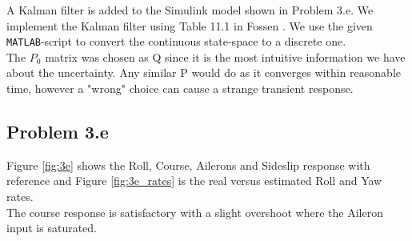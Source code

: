 A Kalman filter is added to the Simulink model shown in Problem 3.e. We implement the Kalman filter using Table 11.1 in Fossen \cite{Fossen2011}. We use the given \texttt{MATLAB}-script to convert the continuous state-space to a discrete one. \\

The $P_0$ matrix was chosen as Q since it is the most intuitive information we have about the uncertainty. Any similar P would do as it converges within reasonable time, however a "wrong" choice can cause a strange transient response. \\

\subsection*{Problem 3.e}

Figure \ref{fig:3e} shows the Roll, Course, Ailerons and Sideslip response with reference and Figure \ref{fig:3e_rates} is the real versus estimated Roll and Yaw rates. \\

The course response is satisfactory with a slight overshoot where the Aileron input is saturated. \\ 

